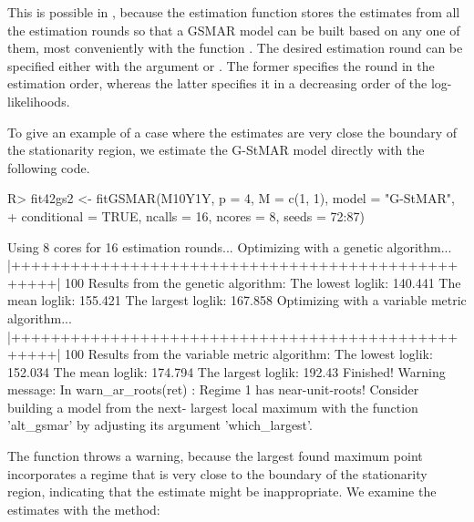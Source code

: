 \documentclass[nojss]{jss} %
\begin{document}
This is possible in , because the estimation function  stores the estimates from all the estimation rounds so that a GSMAR model can be built based on any one of them, most conveniently with the function . The desired estimation round can be specified either with the argument  or . The former specifies the round in the estimation order, whereas the latter specifies it in a decreasing order of the log-likelihoods.

To give an example of a case where the estimates are very close the boundary of the stationarity region, we estimate the G-StMAR model directly with the following code.
%
\begin{CodeChunk}
\begin{CodeInput}
R> fit42gs2 <- fitGSMAR(M10Y1Y, p = 4, M = c(1, 1), model = "G-StMAR",
+    conditional = TRUE, ncalls = 16, ncores = 8, seeds = 72:87)
\end{CodeInput}
\begin{CodeOutput}
Using 8 cores for 16 estimation rounds...
Optimizing with a genetic algorithm...
  |++++++++++++++++++++++++++++++++++++++++++++++++++| 100%
Results from the genetic algorithm:
The lowest loglik:  140.441
The mean loglik:    155.421
The largest loglik: 167.858
Optimizing with a variable metric algorithm...
  |++++++++++++++++++++++++++++++++++++++++++++++++++| 100%
Results from the variable metric algorithm:
The lowest loglik:  152.034
The mean loglik:    174.794
The largest loglik: 192.43
Finished!
Warning message:
In warn_ar_roots(ret) :
  Regime 1 has near-unit-roots! Consider building a model from the next-
  largest local maximum with the function 'alt_gsmar' by adjusting its
  argument 'which_largest'.
\end{CodeOutput}
\end{CodeChunk}
%
The function throws a warning, because the largest found maximum point incorporates a regime that is very close to the boundary of the stationarity region, indicating that the estimate might be inappropriate.
We examine the estimates with the  method:
%
\end{document}
